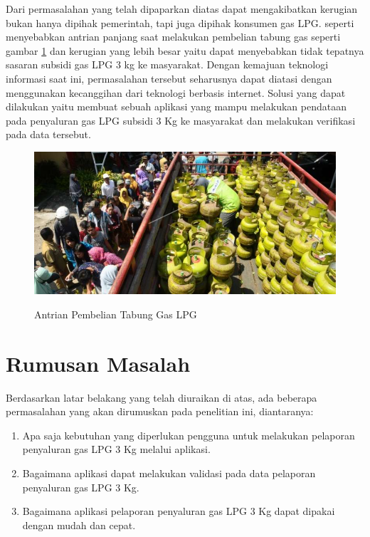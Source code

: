 \par Dari permasalahan yang telah dipaparkan diatas dapat mengakibatkan kerugian bukan hanya dipihak pemerintah, tapi juga dipihak konsumen gas LPG. seperti menyebabkan antrian panjang saat melakukan pembelian tabung gas seperti gambar \ref{antrian} dan kerugian yang lebih besar yaitu dapat menyebabkan tidak tepatnya sasaran subsidi gas LPG 3 kg ke masyarakat. Dengan kemajuan teknologi informasi saat ini, permasalahan tersebut seharusnya dapat diatasi dengan menggunakan kecanggihan dari teknologi berbasis internet. Solusi yang dapat dilakukan yaitu membuat sebuah aplikasi yang mampu melakukan pendataan pada penyaluran gas LPG subsidi 3 Kg ke masyarakat dan melakukan verifikasi pada data tersebut.
\begin{figure}[H]
	\centering
	\includegraphics [width = 15cm]{gambar/antrian}
	\caption{Antrian Pembelian Tabung Gas LPG }
	\citep{antaraRiau}
	\label{antrian}
\end{figure}

\section{Rumusan Masalah}
Berdasarkan latar belakang yang telah diuraikan di atas, ada beberapa permasalahan yang akan dirumuskan pada penelitian ini, diantaranya:
\begin{enumerate}
	\item Apa saja kebutuhan yang diperlukan pengguna untuk melakukan pelaporan penyaluran gas LPG 3 Kg melalui aplikasi.
	\item Bagaimana aplikasi dapat melakukan validasi pada data pelaporan penyaluran gas LPG 3 Kg.
	\item Bagaimana aplikasi pelaporan penyaluran gas LPG 3 Kg dapat dipakai dengan mudah dan cepat.
\end{enumerate}

